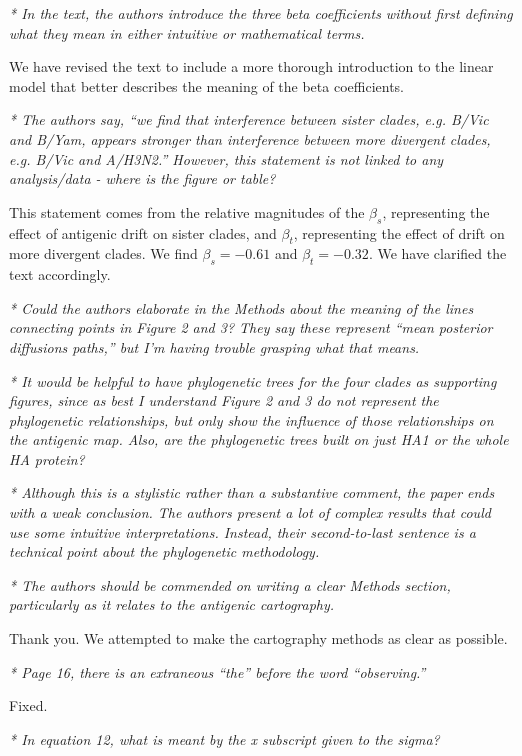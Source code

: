 \documentclass[11pt,oneside,letterpaper]{article}
\begin{document}
\textsl{* In the text, the authors introduce the three beta coefficients without first defining what they mean in either intuitive or mathematical terms.}

We have revised the text to include a more thorough introduction to the linear model that better describes the meaning of the beta coefficients.

\textsl{* The authors say, ``we find that interference between sister clades, e.g. B/Vic and B/Yam, appears stronger than interference between more divergent clades, e.g. B/Vic and A/H3N2.'' However, this statement is not linked to any analysis/data - where is the figure or table?}

This statement comes from the relative magnitudes of the $\beta_s$, representing the effect of antigenic drift on sister clades, and $\beta_t$, representing the effect of drift on more divergent clades.  We find $\beta_s = -0.61$ and $\beta_t = -0.32$.  We have clarified the text accordingly.

\textsl{* Could the authors elaborate in the Methods about the meaning of the lines connecting points in Figure 2 and 3? They say these represent ``mean posterior diffusions paths,'' but I'm having trouble grasping what that means.}

\textsl{* It would be helpful to have phylogenetic trees for the four clades as supporting figures, since as best I understand Figure 2 and 3 do not represent the phylogenetic relationships, but only show the influence of those relationships on the antigenic map. Also, are the phylogenetic trees built on just HA1 or the whole HA protein?}

\textsl{* Although this is a stylistic rather than a substantive comment, the paper ends with a weak conclusion. The authors present a lot of complex results that could use some intuitive interpretations. Instead, their second-to-last sentence is a technical point about the phylogenetic methodology.}

\textsl{* The authors should be commended on writing a clear Methods section, particularly as it relates to the antigenic cartography.}

Thank you. We attempted to make the cartography methods as clear as possible.

\textsl{* Page 16, there is an extraneous ``the'' before the word ``observing.''}

Fixed.

\textsl{* In equation 12, what is meant by the x subscript given to the sigma?}
\end{document}
